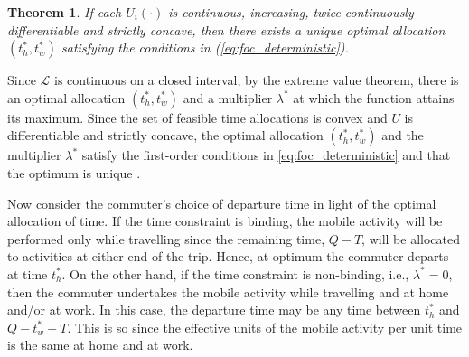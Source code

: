 \documentclass[12pt,a4paper,british]{article}
\makeatletter
\newenvironment{proof}[1][\proofname]{\par
    \normalfont\topsep6\p@\@plus6\p@\relax
    \trivlist
    \itemindent\parindent
    \item[\hskip\labelsep
          \scshape
      #1]\ignorespaces
  }{%
    \endtrivlist\@endpefalse
  }
\providecommand{\proofname}{Proof}
\newtheorem{theorem}{Theorem}[section]
\makeatother
\begin{document}
\begin{theorem}
\label{thm:optimum_det}
If each $U_{i}\left(\cdot\right)$ is continuous, increasing, twice-continuously differentiable and strictly concave, then there exists a unique optimal allocation $\left( t_{h}^{\ast}, t_{w}^{\ast} \right)$ satisfying the conditions in (\ref{eq:foc_deterministic}).
\end{theorem}

\begin{proof} 
Since $\mathcal{L}$ is continuous on a closed interval, by the extreme value theorem, there is an optimal allocation $\left(t_{h}^{\ast},t_{w}^{\ast}\right)$ and a multiplier $\lambda^{\ast}$ at which the function attains its maximum. Since the set of feasible time allocations is convex and $U$ is differentiable and strictly concave, the optimal allocation  $\left(t_{h}^{\ast},t_{w}^{\ast}\right)$ and the multiplier $\lambda^{\ast} $ satisfy the first-order conditions in \eqref{eq:foc_deterministic} and that the optimum is unique \citep[Theorem 1.19 and Theorem 1.20 in][]{delaFonte_mathematical_2000}.
\end{proof}

Now consider the commuter's choice of departure time in light of the optimal allocation of time. If the time constraint is binding, the mobile activity will be performed only while travelling since the remaining time, $Q-T$, will be allocated to activities at either end of the trip. Hence, at optimum the commuter departs at time $t_{h}^{\ast}$. On the other hand, if the time constraint is non-binding, i.e., $\lambda^{\ast}=0$, then the commuter undertakes the mobile activity while travelling and at home and/or at work. In this case, the departure time may be any time between $t_{h}^{\ast}$ and $Q-t_{w}^{\ast}-T$. This is so since the effective units of the mobile activity per unit time is the same at home and at work.
\begin{comment}
Since travel time is deterministic, there is no need for the commuter to give head start. As such the departure time can set in such a way that it is aligned with the optimal time allocation. The optimal departure time depends on whether or not the time constraint is binding. If the time constraint is binding, time at the origin and destination will be fully devoted to the home-based activity and the work-based activity, respectively, with the mobile activity being carried out only while travelling.
\end{comment}
\end{document}
